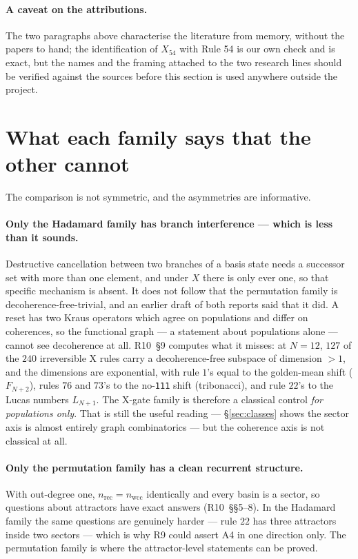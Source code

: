 \documentclass[11pt]{article}
\newcommand{\rt}[1]{\texttt{#1}}
\newcommand{\wcc}{\mathrm{wcc}}
\newcommand{\rec}{\mathrm{rec}}
\theoremstyle{plain}
\theoremstyle{remark}
\begin{document}
\paragraph{A caveat on the attributions.} The two paragraphs above characterise
the literature from memory, without the papers to hand; the identification of
$X_{54}$ with Rule 54 is our own check and is exact, but the names and the
framing attached to the two research lines should be verified against the sources
before this section is used anywhere outside the project.

\section{What each family says that the other cannot}
\label{sec:asym}

The comparison is not symmetric, and the asymmetries are informative.

\paragraph{Only the Hadamard family has branch interference --- which is less than
it sounds.} Destructive cancellation between two branches of a basis state needs
a successor set with more than one element, and under $X$ there is only ever one,
so that specific mechanism is absent. It does not follow that the permutation
family is decoherence-free-trivial, and an earlier draft of both reports said
that it did. A reset has two Kraus operators which agree on populations and
differ on coherences, so the functional graph --- a statement about populations
alone --- cannot see decoherence at all. R10~\S9 computes what it misses: at
$N=12$, $127$ of the $240$ irreversible X rules carry a decoherence-free subspace
of dimension $>1$, and the dimensions are exponential, with rule $1$'s equal to
the golden-mean shift ($F_{N+2}$), rules $76$ and $73$'s to the no-\rt{111} shift
(tribonacci), and rule $22$'s to the Lucas numbers $L_{N+1}$. The X-gate family
is therefore a classical control \emph{for populations only}. That is still the
useful reading --- \S\ref{sec:classes} shows the sector axis is almost entirely
graph combinatorics --- but the coherence axis is not classical at all.

\paragraph{Only the permutation family has a clean recurrent structure.} With
out-degree one, $n_\rec=n_\wcc$ identically and every basin is a sector, so
questions about attractors have exact answers (R10~\S\S5--8). In the Hadamard
family the same questions are genuinely harder --- rule $22$ has three attractors
inside two sectors --- which is why R9 could assert A4 in one direction only. The
permutation family is where the attractor-level statements can be proved.
\end{document}
